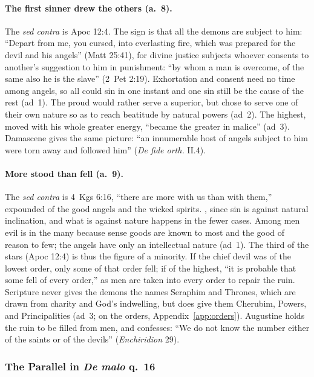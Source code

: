 \paragraph{The first sinner drew the others (a.~8).} The \emph{sed
contra} is Apoc 12:4. 
The sign is that all the demons are subject to him: ``Depart from me,
you cursed, into everlasting fire, which was prepared for the devil and
his angels'' (Matt 25:41), for divine justice subjects whoever consents
to another's suggestion to him in punishment: ``by whom a man is
overcome, of the same also he is the slave'' (2~Pet 2:19). Exhortation
and consent need no time among angels, so all could sin in one instant
and one sin still be the cause of the rest (ad~1). The proud would
rather serve a superior, but chose to serve one of their own nature so
as to reach beatitude by natural powers (ad~2). The highest, moved with
his whole greater energy, ``became the greater in malice'' (ad~3).
Damascene gives the same picture: ``an innumerable host of angels
subject to him were torn away and followed him'' (\emph{De fide orth.}
II.4).

\paragraph{More stood than fell (a.~9).} The \emph{sed contra} is
4~Kgs 6:16, ``there are more with us than with them,'' expounded of the
good angels and the wicked spirits. , since sin is against natural inclination, and what
is against nature happens in the fewer cases. Among men evil is in the
many because sense goods are known to most and the good of reason to
few; the angels have only an intellectual nature (ad~1). The third of
the stars (Apoc 12:4) is thus the figure of a minority. If the chief
devil was of the lowest order, only some of that order fell; if of the
highest, ``it is probable that some fell of every order,'' as men are
taken into every order to repair the ruin. Scripture never gives the
demons the names Seraphim and Thrones, which are drawn from charity and
God's indwelling, but does give them Cherubim, Powers, and
Principalities (ad~3; on the orders, Appendix~\ref{app:orders}).
Augustine holds the ruin to be filled from men, and confesses: ``We do
not know the number either of the saints or of the devils''
(\emph{Enchiridion} 29).

\subsubsection*{The Parallel in \emph{De malo} q.~16}

